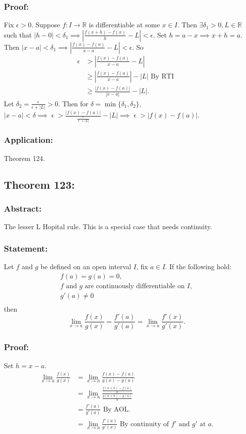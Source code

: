 \documentclass{article}
\DeclareMathOperator\eps{\epsilon}
\begin{document}
\subsubsection*{Proof:}
Fix $\epsilon>0$. Suppose $f:I \to \mathbb{R}$ is differentiable at some $x \in I$. Then
$\exists \delta_1>0, L\in \mathbb{R}$ such that $|h-0|<\delta_1 \implies |\frac{f(x+h)-f(x)}{h}-L|<\epsilon$.
Set $h=a-x \implies x+h = a$. Then
$|x-a|<\delta_1 \implies |\frac{f(x)-f(a)}{x-a}-L|<\epsilon$.
So \begin{align*}
\epsilon &> \left| \frac{f(x)-f(a)}{x-a}-L \right| \\
& \geq \left| \frac{f(x)-f(a)}{x-a} \right|-|L| \text{ By RTI } \\
& \geq \frac{|f(x)-f(a)|}{|x-a|}-|L|.
\end{align*}
Let $\delta_2 = \frac{\epsilon}{\epsilon + |L|}>0$. Then for $\delta = \min \{\delta_1,\delta_2 \}$,
$|x-a|<\delta \implies \eps > \frac{|f(x)-f(a)|}{\frac{\eps}{\eps + |L|}}-|L|
\implies \eps > |f(x)-f(a)|$.
\subsubsection*{Application:}
Theorem 124.
\subsection{Theorem 123:}
\subsubsection*{Abstract:}
The lesser L Hopital rule. This is a special case that needs continuity.
\subsubsection*{Statement:}
Let $f$ and $g$ be defined on an open interval $I$, fix $a \in I$.
If the following hold:
\begin{gather*}
f(a) = g(a) = 0, \\
f \text{ and } g \text{ are continuously differentiable on } I, \\
g'(a) \neq 0 \\
\end{gather*}
then \[
\lim_{x \to a}\frac{f(x)}{g(x)} = \frac{f'(a)}{g'(a)} = \lim_{x \to a}\frac{f'(x)}{g'(x)}.
\]
\subsubsection*{Proof:}
Set $h = x-a$.
\begin{align*}
\lim_{x \to a}\frac{f(x)}{g(x)} &= \lim_{x \to a}\frac{f(x)-f(a)}{g(x)-g(a)} \\
&= \lim_{x \to a}\frac{\frac{f(a+h)-f(a)}{h}}{\frac{g(a+h)-g(a)}{h}} \\
&= \frac{f'(a)}{g'(a)} \text{ By AOL. } \\
&= \lim_{x \to a}\frac{f'(x)}{g'(x)} \text{ By continuity of $f'$ and $g'$ at $a$.}
\end{align*}
\end{document}
